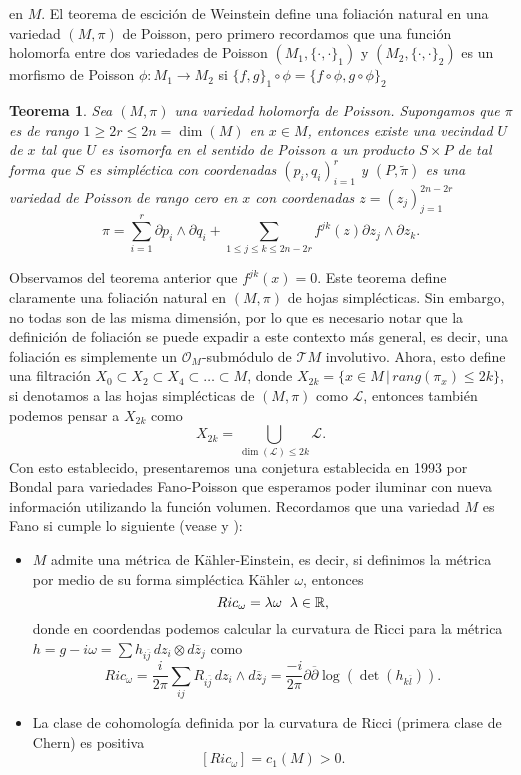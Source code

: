 \documentclass[letterpaper]{report}
\newtheorem{teorema}{Teorema}[chapter]
\newcommand{\re}{\ensuremath{\mathbb R }}
\begin{document}
en $M$. El teorema de escici\'on de Weinstein define una foliaci\'on natural en una variedad $(M,\pi)$ de Poisson, pero primero 
recordamos que una funci\'on holomorfa entre dos variedades de Poisson $(M_1,\{\cdot,\cdot\}_1)$ y $(M_2,\{\cdot,\cdot\}_2)$ es un morfismo de Poisson 
$\phi:M_1\rightarrow M_2$ si $\{f,g\}_1\circ\phi=\{f\circ\phi,g\circ\phi\}_2$
\begin{teorema}
        Sea $(M,\pi)$ una variedad holomorfa de Poisson. Supongamos que $\pi$ es de rango $1\geq 2r\leq 2n=\dim(M)$ en $x\in M$, entonces existe 
        una vecindad $U$ de $x$ tal que $U$ es isomorfa en el sentido de Poisson a un producto $S\times P$ de tal forma que $S$ es
        simpl\'ectica con coordenadas $(p_i,q_i)_{i=1}^r$ y $(P,\tilde{\pi})$ es una variedad de Poisson de rango cero en $x$
        con coordenadas $z=(z_j)_{j=1}^{2n-2r}$
        \[
                \pi=\sum_{i=1}^r \partial{p_i}\wedge\partial{q_i}+\sum_{1\leq j\leq k\leq 2n-2r} f^{jk}(z)\partial{z_j}\wedge\partial{z_k}.
        \]
\end{teorema} 
\noindent Observamos del teorema anterior que $f^{jk}(x)=0$. Este teorema define claramente una foliaci\'on natural en $(M,\pi)$ de hojas
simpl\'ecticas. Sin embargo, no todas son de las misma dimensi\'on, por lo que es necesario notar que la definici\'on de foliaci\'on
se puede expadir a este contexto m\'as general, es decir, una foliaci\'on es simplemente un $\mathcal{O}_M$-subm\'odulo de $\mathcal{T}M$ involutivo.
Ahora, esto define una filtraci\'on $X_0\subset X_2\subset X_4\subset\dots\subset M$, donde $X_{2k}=\{x\in M\,|\,rang(\pi_x)\leq 2k\}$,
si denotamos a las hojas simpl\'ecticas de $(M,\pi)$ como $\mathcal{L}$, entonces tambi\'en podemos pensar a $X_{2k}$ como 
$$
X_{2k}=\bigcup_{\dim(\mathcal{L})\leq 2k}\mathcal{L}.
$$
Con esto establecido, presentaremos una conjetura establecida en 1993 por Bondal para variedades Fano-Poisson que esperamos poder 
iluminar con nueva informaci\'on utilizando la funci\'on volumen. Recordamos que una variedad $M$ es Fano si cumple lo siguiente (vease \cite{S-Yau} y \cite{ZB}):
\begin{itemize}
        \item $M$ admite una m\'etrica de K\"ahler-Einstein, es decir, si definimos la m\'etrica por medio de su forma simpl\'ectica 
        K\"ahler $\omega$, entonces
                $$Ric_{\omega}=\lambda\omega\hspace{0.2cm}\lambda\in\re,$$
        donde en coordendas podemos calcular la curvatura de Ricci para la m\'etrica 
        \hbox{$h=g-i\omega=\sum h_{i\overline{j}}\,dz_i\otimes d\overline{z}_j$} como
        $$Ric_{\omega}=\frac{i}{2\pi}\sum_{ij}R_{i\overline{j}}\,dz_i\wedge d\overline{z}_j=\frac{-i}{2\pi}\partial\overline{\partial}\log(\det(h_{k\overline{l}})).$$
        \item La clase de cohomolog\'ia definida por la curvatura de Ricci (primera clase de Chern) es positiva
        $$
        [Ric_{\omega}]=c_1(M)>0.
        $$
\end{itemize}
\end{document}
